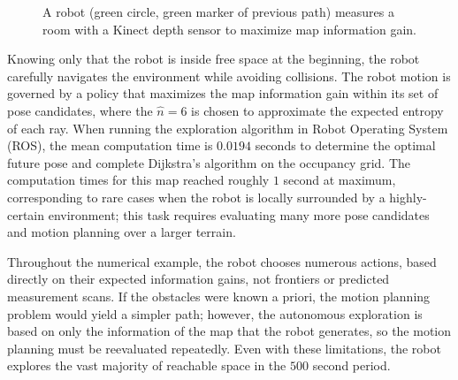 \documentclass[letterpaper, 10pt, conference]{ieeeconf}
\begin{document}
\begin{figure}
{{	}
}
\caption{A robot (green circle, green marker of previous path) measures a room with a Kinect depth sensor to maximize map information gain. %
}
\label{fig:AutonomousExploration}
\end{figure}

Knowing only that the robot is inside free space at the beginning, the robot carefully navigates the environment while avoiding collisions. The robot motion is governed by a policy that maximizes the map information gain within its set of pose candidates, where the $\hat n=6$ is chosen to approximate the expected entropy of each ray. 
When running the exploration algorithm in Robot Operating System (ROS), the mean computation time is $0.0194$ seconds to determine the optimal future pose and complete Dijkstra's algorithm on the occupancy grid.
The computation times for this map reached roughly $1$ second at maximum, corresponding to rare cases when the robot is locally surrounded by a highly-certain environment; this task requires evaluating many more pose candidates and motion planning over a larger terrain. %

Throughout the numerical example, the robot chooses numerous actions, based directly on their expected information gains, not frontiers or predicted measurement scans. If the obstacles were known a priori, the motion planning problem would yield a simpler path; however, the autonomous exploration is based on only the information of the map that the robot generates, so the motion planning must be reevaluated repeatedly. Even with these limitations, the robot explores the vast majority of reachable space in the $500$ second period. 
\end{document}
